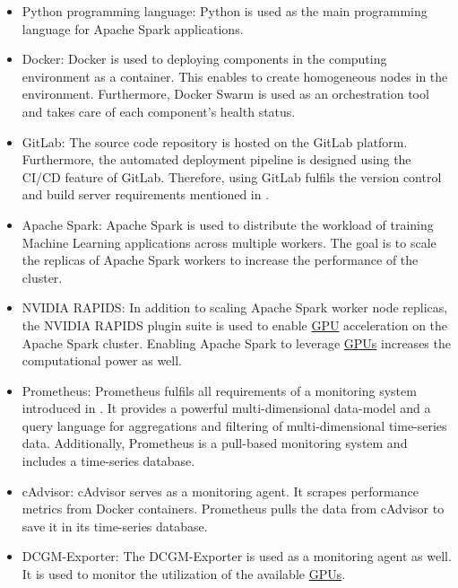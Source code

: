 \begin{itemize}
\item Python programming language: Python is used as the main programming language for Apache Spark applications.

\item Docker: Docker is used to deploying components in the computing environment as a container. This enables to create homogeneous nodes in the environment. Furthermore, Docker Swarm is used as an orchestration tool and takes care of each component's health status.

\item GitLab: The source code repository is hosted on the GitLab platform. Furthermore, the automated deployment pipeline is designed using the CI/CD feature of GitLab. Therefore, using GitLab fulfils the version control and build server requirements mentioned in .

\item Apache Spark: Apache Spark is used to distribute the workload of training Machine Learning applications across multiple workers. The goal is to scale the replicas of Apache Spark workers to increase the performance of the cluster.

\item NVIDIA RAPIDS: In addition to scaling Apache Spark worker node replicas, the NVIDIA RAPIDS plugin suite is used to enable \hyperlink{abbr:gpu}{GPU} acceleration on the Apache Spark cluster. Enabling Apache Spark to leverage \hyperlink{abbr:gpu}{GPUs} increases the computational power as well.

\item Prometheus: 
Prometheus fulfils all requirements of a monitoring system introduced in . It provides a powerful multi-dimensional data-model and a query language for aggregations and filtering of multi-dimensional time-series data. Additionally, Prometheus is a pull-based monitoring system and includes a time-series database.

\item cAdvisor:
cAdvisor serves as a monitoring agent. It scrapes performance metrics from Docker containers. Prometheus pulls the data from cAdvisor to save it in its time-series database.

\item DCGM-Exporter:
The DCGM-Exporter is used as a monitoring agent as well. It is used to monitor the utilization of the available \hyperlink{abbr:gpu}{GPUs}.
\end{itemize}


